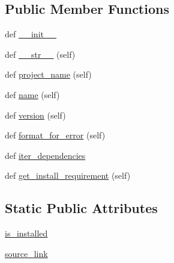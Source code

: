 \subsection*{Public Member Functions}
\begin{DoxyCompactItemize}
\item 
def \hyperlink{classpip_1_1__internal_1_1resolution_1_1resolvelib_1_1candidates_1_1RequiresPythonCandidate_a64f9488bfbe3d773336b7acee44b0798}{\+\_\+\+\_\+init\+\_\+\+\_\+}
\item 
def \hyperlink{classpip_1_1__internal_1_1resolution_1_1resolvelib_1_1candidates_1_1RequiresPythonCandidate_a103b52383481338f44ddab9d5d084c32}{\+\_\+\+\_\+str\+\_\+\+\_\+} (self)
\item 
def \hyperlink{classpip_1_1__internal_1_1resolution_1_1resolvelib_1_1candidates_1_1RequiresPythonCandidate_a9d4bd3ae7d3fbf2175b2315ddbd4cd1b}{project\+\_\+name} (self)
\item 
def \hyperlink{classpip_1_1__internal_1_1resolution_1_1resolvelib_1_1candidates_1_1RequiresPythonCandidate_a87ea7115222bbaecd819bb1489001390}{name} (self)
\item 
def \hyperlink{classpip_1_1__internal_1_1resolution_1_1resolvelib_1_1candidates_1_1RequiresPythonCandidate_af16bb188496e6e10928c39b856dc7da1}{version} (self)
\item 
def \hyperlink{classpip_1_1__internal_1_1resolution_1_1resolvelib_1_1candidates_1_1RequiresPythonCandidate_a356ba9b07cd4b9390221b59fdcce413e}{format\+\_\+for\+\_\+error} (self)
\item 
def \hyperlink{classpip_1_1__internal_1_1resolution_1_1resolvelib_1_1candidates_1_1RequiresPythonCandidate_a84ed9c0fa1c3db9dcbe1f1065c167426}{iter\+\_\+dependencies}
\item 
def \hyperlink{classpip_1_1__internal_1_1resolution_1_1resolvelib_1_1candidates_1_1RequiresPythonCandidate_a193c2e9700f18dd384bd2b1b6b5c33bf}{get\+\_\+install\+\_\+requirement} (self)
\end{DoxyCompactItemize}
\subsection*{Static Public Attributes}
\begin{DoxyCompactItemize}
\item 
\hyperlink{classpip_1_1__internal_1_1resolution_1_1resolvelib_1_1candidates_1_1RequiresPythonCandidate_acfdb0ee4abdc9bdbf7efb8b029224012}{is\+\_\+installed}
\item 
\hyperlink{classpip_1_1__internal_1_1resolution_1_1resolvelib_1_1candidates_1_1RequiresPythonCandidate_ad2ba94171bcd3e0c3b723c769d2d67cc}{source\+\_\+link}
\end{DoxyCompactItemize}



